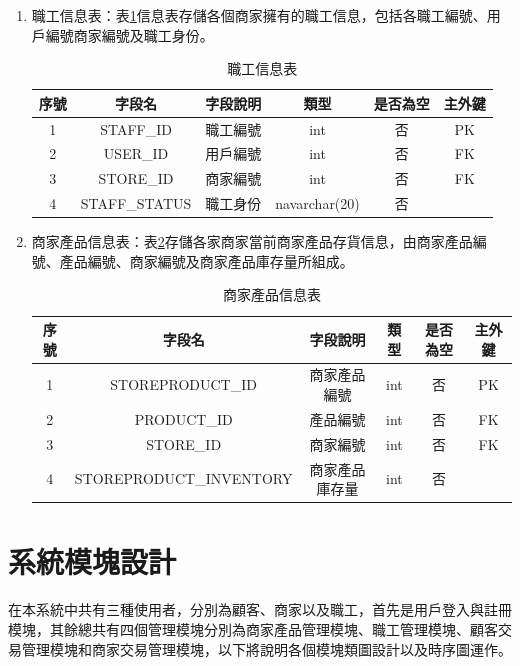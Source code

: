 \begin{enumerate}
		\item 職工信息表：表\ref{staff}信息表存儲各個商家擁有的職工信息，包括各職工編號、用戶編號商家編號及職工身份。
				\begin{table}[!htbp]
				\centering
				\caption{職工信息表}
				\label{staff}
				\begin{tabular}{|c|c|c|c|c|c|}
				\hline
				序號 & 字段名 & 字段說明 & 類型 & 是否為空 & 主外鍵 \\ \hline
				1 & STAFF\_ID & 職工編號 & int & 否 & PK \\ \hline
				2 & USER\_ID & 用戶編號 & int & 否 & FK \\ \hline
				3 & STORE\_ID & 商家編號 & int & 否 & FK \\ \hline
				4 & STAFF\_STATUS & 職工身份 & navarchar(20) & 否 &  \\ \hline
				\end{tabular}
				\end{table}

		\item 商家產品信息表：表\ref{storeproduct}存儲各家商家當前商家產品存貨信息，由商家產品編號、產品編號、商家編號及商家產品庫存量所組成。
				\begin{table}[!htbp]
				\centering
				\caption{商家產品信息表}
				\label{storeproduct}
				\begin{tabular}{|c|c|c|c|c|c|}
				\hline
				序號 & 字段名 & 字段說明 & 類型 & 是否為空 & 主外鍵 \\ \hline
				1 & STOREPRODUCT\_ID & 商家產品編號 & int & 否 & PK \\ \hline
				2 & PRODUCT\_ID & 產品編號 & int & 否 & FK \\ \hline
				3 & STORE\_ID & 商家編號 & int & 否 & FK \\ \hline
				4 & STOREPRODUCT\_INVENTORY & 商家產品庫存量 & int & 否 &  \\ \hline
				\end{tabular}
				\end{table}

	\end{enumerate}

\section{系統模塊設計}
在本系統中共有三種使用者，分別為顧客、商家以及職工，首先是用戶登入與註冊模塊，其餘總共有四個管理模塊分別為商家產品管理模塊、職工管理模塊、顧客交易管理模塊和商家交易管理模塊，以下將說明各個模塊類圖設計以及時序圖運作。

